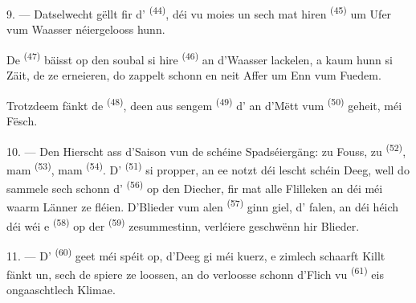 \VUsaut{5.0mm}
\VUsaut{3.4mm}

9. --- Datselwecht gëllt fir d' \textsuperscript{(44)}, déi
vu moies un sech mat hiren  \textsuperscript{(45)} um Ufer vum
Waasser néiergelooss hunn.

De  \textsuperscript{(47)} bäisst op den  soubal si
hire  \textsuperscript{(46)} an d'Waasser lackelen, a kaum hunn si
Zäit, de  ze erneieren, do zappelt schonn en neit Affer um Enn vum
Fuedem.

Trotzdeem fänkt de  \textsuperscript{(48)}, deen aus sengem
 \textsuperscript{(49)} d' an d'Mëtt vum
 \textsuperscript{(50)} geheit, méi Fësch.

10. --- Den Hierscht ass d'Saison vun de schéine Spadséiergäng: zu Fouss, zu
 \textsuperscript{(52)}, mam  \textsuperscript{(53)}, mam
 \textsuperscript{(54)}. D' \textsuperscript{(51)} si
propper, an ee notzt déi lescht schéin Deeg, well do sammele sech schonn
d' \textsuperscript{(56)} op den Diecher, fir mat alle Flilleken an
déi méi waarm Länner ze fléien. D'Blieder vum alen 
\textsuperscript{(57)} ginn giel, d' falen, an déi héich
 déi wéi e  \textsuperscript{(58)} op der
 \textsuperscript{(59)} zesummestinn, verléiere geschwënn hir
Blieder.

11. --- D' \textsuperscript{(60)} geet méi spéit op, d'Deeg gi méi
kuerz, e zimlech schaarft Killt fänkt un, sech de  spiere ze loossen, an
do verloosse schonn d'Flich vu  \textsuperscript{(61)} eis
ongaaschtlech Klimae.

\VUsaut{6.0mm}
\VUfilet{22mm}
